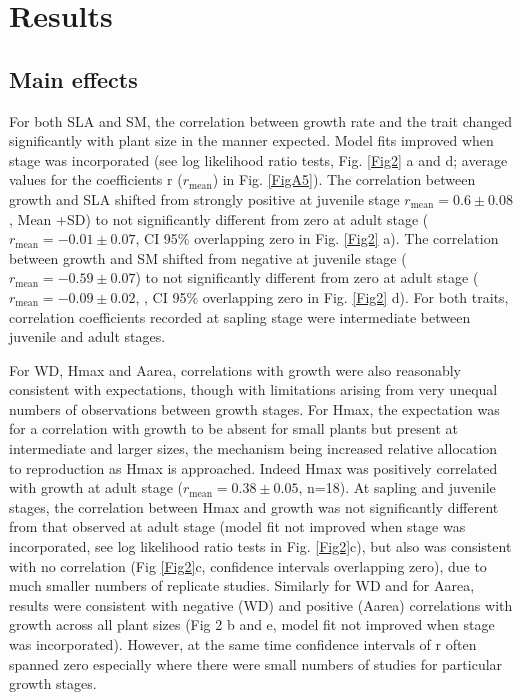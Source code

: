 \documentclass[a4paper]{article}\usepackage[]{graphicx}\usepackage[]{color}
\begin{document}
\section*{Results}\label{results}

\subsection*{Main effects}

For both SLA and SM, the correlation between growth rate and the trait  changed significantly with plant size in the manner expected. Model fits improved when stage was incorporated (see log likelihood ratio tests, Fig. \ref{Fig2} a and d; average values for the coefficients r ($r_{\textrm{mean}}$) in Fig. \ref{FigA5}). The correlation between growth and SLA shifted from strongly positive at juvenile stage $r_{\textrm{mean}}=0.6 \pm 0.08$, Mean +SD) to not significantly different from zero at adult stage ($r_{\textrm{mean}}= -0.01 \pm 0.07$, CI 95\% overlapping zero in Fig. \ref{Fig2} a). The correlation between growth and SM shifted from negative at juvenile stage ($r_{\textrm{mean}}= -0.59 \pm 0.07$) to not significantly different from zero at adult stage ($r_{\textrm{mean}}= -0.09 \pm 0.02$, , CI 95\% overlapping zero in Fig. \ref{Fig2} d). For both traits,  correlation coefficients recorded at sapling stage were intermediate between juvenile and adult stages. 

For WD, Hmax and Aarea, correlations with growth were also reasonably consistent with expectations, though with limitations arising from very unequal numbers of observations between growth stages. For Hmax, the expectation was for a correlation with growth to be absent for small plants but present at intermediate and larger sizes, the mechanism being increased relative allocation to reproduction as Hmax is approached. Indeed Hmax was positively correlated with growth at adult stage ($r_{\textrm{mean}}= 0.38 \pm 0.05$, n=18). At sapling and juvenile stages, the correlation between Hmax and growth was not significantly different from that observed at adult stage (model fit not improved when stage was incorporated, see log likelihood ratio tests in Fig. \ref{Fig2}c), but also was consistent with no correlation (Fig \ref{Fig2}c, confidence intervals overlapping zero), due to much smaller numbers of replicate studies. Similarly for WD and for Aarea, results were consistent with negative (WD) and positive (Aarea) correlations with growth across all plant sizes (Fig 2 b and e, model fit not improved when stage was incorporated). However, at the same time confidence intervals of r often spanned zero especially where there were small numbers of studies for particular growth stages. 
\end{document}
